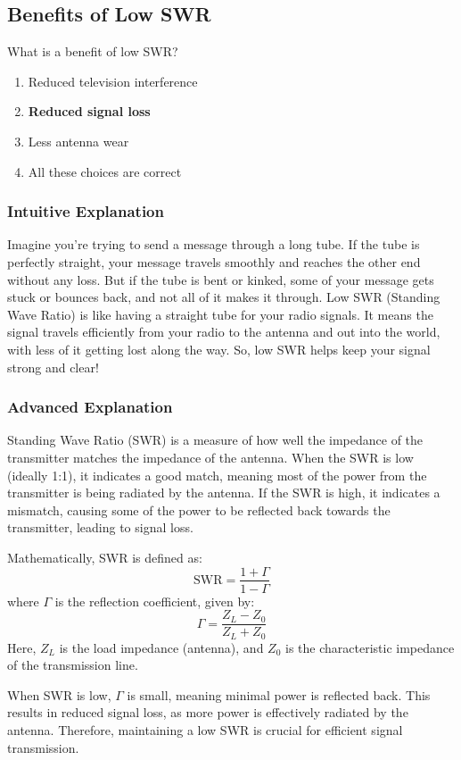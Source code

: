 \subsection{Benefits of Low SWR}
\label{T9B01}

\begin{tcolorbox}[colback=gray!10!white,colframe=black!75!black,title=T9B01]
What is a benefit of low SWR?
\begin{enumerate}[label=\Alph*)]
    \item Reduced television interference
    \item \textbf{Reduced signal loss}
    \item Less antenna wear
    \item All these choices are correct
\end{enumerate}
\end{tcolorbox}

\subsubsection{Intuitive Explanation}
Imagine you're trying to send a message through a long tube. If the tube is perfectly straight, your message travels smoothly and reaches the other end without any loss. But if the tube is bent or kinked, some of your message gets stuck or bounces back, and not all of it makes it through. Low SWR (Standing Wave Ratio) is like having a straight tube for your radio signals. It means the signal travels efficiently from your radio to the antenna and out into the world, with less of it getting lost along the way. So, low SWR helps keep your signal strong and clear!

\subsubsection{Advanced Explanation}
Standing Wave Ratio (SWR) is a measure of how well the impedance of the transmitter matches the impedance of the antenna. When the SWR is low (ideally 1:1), it indicates a good match, meaning most of the power from the transmitter is being radiated by the antenna. If the SWR is high, it indicates a mismatch, causing some of the power to be reflected back towards the transmitter, leading to signal loss.

Mathematically, SWR is defined as:
\[
\text{SWR} = \frac{1 + \Gamma}{1 - \Gamma}
\]
where \(\Gamma\) is the reflection coefficient, given by:
\[
\Gamma = \frac{Z_L - Z_0}{Z_L + Z_0}
\]
Here, \(Z_L\) is the load impedance (antenna), and \(Z_0\) is the characteristic impedance of the transmission line.

When SWR is low, \(\Gamma\) is small, meaning minimal power is reflected back. This results in reduced signal loss, as more power is effectively radiated by the antenna. Therefore, maintaining a low SWR is crucial for efficient signal transmission.

